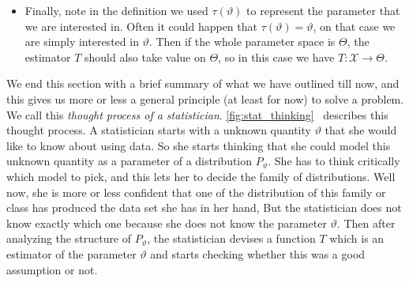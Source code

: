 \documentclass[ 11pt,%
				a4paper,%
				twoside,%
				headinclude,%
				footinclude = true,%
				cleardoublepage = empty,%
				reqno]{scrbook}
\begin{document}
\begin{remarks}
\begin{itemize}
    \item Finally, note in the definition we used $\tau(\vartheta)$ to represent the parameter that we are interested in. Often it could happen that $\tau(\vartheta) = \vartheta$, on that case we are simply interested in $\vartheta$. Then if the whole parameter space is $\Theta$, the estimator $T$ should also take value on $\Theta$, so in this case we have $T: \mathcal{X} \rightarrow \Theta$. 



\end{itemize}
    
\end{remarks}


We end this section with a brief summary of what we have outlined till now, and this gives us more or less a general principle (at least for now) to solve a problem. We call this \emph{thought process of a statistician}. 
\cref{fig:stat_thinking}~ describes this thought process. A statistician starts with  a unknown quantity $\vartheta$ that she would like to know about using data. So she starts thinking that she could model this unknown quantity as a parameter of a distribution $P_{\vartheta}$. She has to think critically which model to pick, and this lets her to decide the family of distributions. Well now, she is more or less confident that one of the distribution of this family or class has produced the data set she has in her hand, But the statistician does not know exactly which one because she does not know the parameter $\vartheta$. Then after analyzing the structure of $P_{\vartheta}$, the statistician devises a function $T$ which is an estimator of the parameter $\vartheta$ and starts checking whether this was a good assumption or not.
\end{document}
